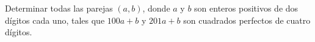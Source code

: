 Determinar todas las parejas $(a,b)$, donde $a$ y $b$ son enteros positivos de dos dígitos cada uno, tales que $100a + b$ y $201a + b$ son cuadrados perfectos de cuatro dígitos.
